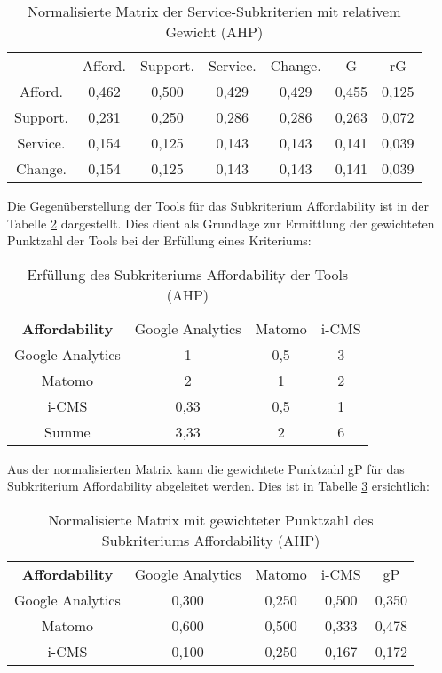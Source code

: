 \begin{table}[h]
  \centering
  \begin{tabular}{ccccccc}
    & Afford. & Support. & Service. & Change. & G & rG \\
    Afford. & 0,462 & 0,500 & 0,429 & 0,429 & 0,455 & 0,125 \\
    Support. & 0,231 & 0,250 & 0,286 & 0,286 & 0,263 & 0,072 \\
    Service. & 0,154 & 0,125 & 0,143 & 0,143 & 0,141 & 0,039 \\
    Change. & 0,154 & 0,125 & 0,143 & 0,143 & 0,141 & 0,039 \\
    \end{tabular} 
  \caption{Normalisierte Matrix der Service-Subkriterien mit relativem Gewicht (AHP)}
  \label{tab:MatrixsubkritservNorm}
  \end{table}

\newpage

  Die Gegenüberstellung der Tools für das Subkriterium Affordability ist in der Tabelle \ref{tab:matrixAffordTools} dargestellt. Dies dient als Grundlage zur Ermittlung der gewichteten Punktzahl der Tools bei der Erfüllung eines Kriteriums:

  \begin{table}[h]
    \centering
    \begin{tabular}{cccc}
      \textbf{Affordability} & Google Analytics & Matomo & i-CMS \\
      Google Analytics & 1 & 0,5 & 3 \\
      Matomo & 2 & 1 & 2 \\
      i-CMS & 0,33 & 0,5 & 1 \\
      Summe & 3,33 & 2 & 6 \\
      \end{tabular} 
    \caption{Erfüllung des Subkriteriums Affordability der Tools (AHP)}
    \label{tab:matrixAffordTools}
    \end{table}

    Aus der normalisierten Matrix kann die gewichtete Punktzahl gP für das Subkriterium Affordability abgeleitet werden. Dies ist in Tabelle \ref{tab:matrixAffordNormalized} ersichtlich:

    \begin{table}[h]
      \centering
      \begin{tabular}{ccccc}
        \textbf{Affordability} & Google Analytics & Matomo & i-CMS & gP \\
        Google Analytics & 0,300 & 0,250 & 0,500 & 0,350 \\
        Matomo & 0,600 & 0,500 & 0,333 & 0,478 \\
        i-CMS & 0,100 & 0,250 & 0,167 & 0,172 \\
        \end{tabular} 
      \caption{Normalisierte Matrix mit gewichteter Punktzahl des Subkriteriums Affordability (AHP)}
      \label{tab:matrixAffordNormalized}
      \end{table}

